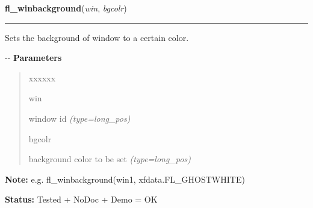 \hspace{.8\funcindent}\begin{boxedminipage}{\funcwidth}

    \raggedright \textbf{fl\_winbackground}(\textit{win}, \textit{bgcolr})

    \vspace{-1.5ex}

    \rule{\textwidth}{0.5\fboxrule}
\setlength{\parskip}{2ex}

Sets the background of window to a certain color.

-{}-
\setlength{\parskip}{1ex}
      \textbf{Parameters}
      \vspace{-1ex}

      \begin{quote}
        \begin{Ventry}{xxxxxx}

          \item[win]


window id
            {\it (type=long\_pos)}

          \item[bgcolr]


background color to be set
            {\it (type=long\_pos)}

        \end{Ventry}

      \end{quote}

\textbf{Note:} 
e.g. fl\_winbackground(win1, xfdata.FL\_GHOSTWHITE)


\textbf{Status:} 
Tested + NoDoc + Demo = OK


    \end{boxedminipage}

    \label{xformslib:flxbasic:fl_winbackground}

    \vspace{0.5ex}

